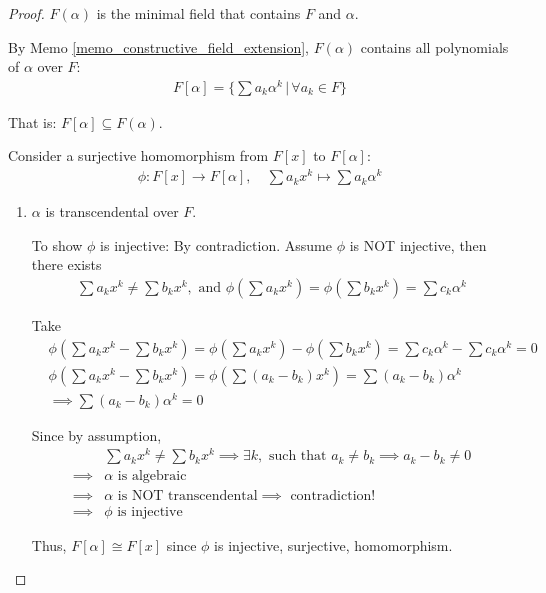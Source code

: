 \documentclass[utf8]{ctexbook}
\begin{document}
\begin{proof}

$F(\alpha)$ is the minimal field that contains $F$ and $\alpha$.

By Memo \ref{memo_constructive_field_extension}, $F(\alpha)$ contains all polynomials of $\alpha$ over $F$:
\begin{align*}
F[\alpha] = \{ \sum a_k \alpha^k \, | \, \forall a_k \in F \}
\end{align*}

That is: $F[\alpha] \subseteq F(\alpha)$.

Consider a surjective homomorphism from $F[x]$ to $F[\alpha]$:
\begin{align*}
\phi: F[x] \longrightarrow F[\alpha], \quad  \sum a_k x^k \mapsto \sum a_k \alpha^k
\end{align*}

\begin{enumerate}
\item{$\alpha$ is transcendental over $F$.

To show $\phi$ is injective: By contradiction. Assume $\phi$ is NOT injective, then there exists 
\begin{align*}
\sum a_k x^k \neq \sum b_k x^k , \mbox{ and } \phi(\sum a_k x^k ) = \phi( \sum b_k x^k ) = \sum c_k \alpha^k
\end{align*}

Take
\begin{align*}
& \phi( \sum a_k x^k  - \sum b_k x^k ) = \phi ( \sum a_k x^k )  - \phi ( \sum b_k x^k) = \sum c_k \alpha^k - \sum c_k \alpha^k = 0 \\
&\phi( \sum a_k x^k  - \sum b_k x^k ) = \phi( \sum (a_k - b_k) x^k ) = \sum (a_k - b_k ) \alpha^k \\
& \implies \sum (a_k - b_k) \alpha^k = 0 
\end{align*}

Since by assumption,
\begin{align*}
& \sum a_k x^k \neq \sum b_k x^k  \implies \exists k, \mbox{ such that } a_k \neq b_k \implies a_k - b_k \neq 0 \\
\implies & \alpha \mbox{ is algebraic} \\
\implies & \alpha \mbox{ is NOT transcendental} \implies \mbox{ contradiction!} \\
\implies & \phi \mbox{ is injective}
\end{align*} 

Thus, $F[\alpha] \cong F[x]$ since $\phi$ is injective, surjective, homomorphism.

}
\end{enumerate}
\end{proof}
\end{document}

